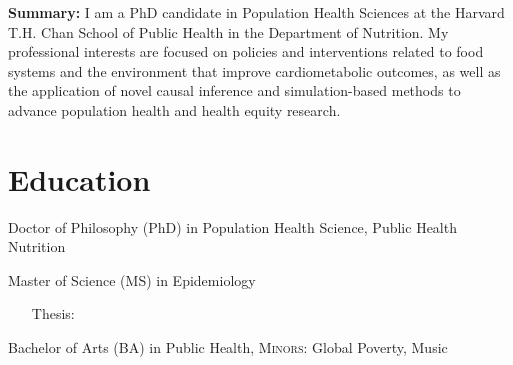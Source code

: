 \documentclass{cv_style}
\begin{document}
\begin{center}
\end{center}


\begin{adjustwidth}{0.7cm}{0.7cm} \parskip 8pt \begin{small} \textbf{Summary:} I am a PhD candidate in Population Health Sciences at the Harvard T.H. Chan School of Public Health in the Department of Nutrition. My professional interests are focused on policies and interventions related to food systems and the environment that improve cardiometabolic outcomes, as well as the application of novel causal inference and simulation-based methods to advance population health and health equity research.  
\end{small}
\end{adjustwidth}


\parskip -5pt 
\section{Education}
\parskip -5pt
\parskip -4pt \noindent Doctor of Philosophy (PhD) in Population Health Science, Public Health Nutrition

\parskip -4pt Master of Science (MS) in Epidemiology \\
    \vspace{-1em}
    \begingroup
    \addtolength{\leftmargini}{3em} \begin{itemize}
        \item[\hspace{1em}Thesis:] 
    \end{itemize}
    \endgroup
\parskip -8pt  

\parskip -4pt \noindent  Bachelor of Arts (BA) in Public Health, \textsc{Minors:} Global Poverty, Music
\end{document}
